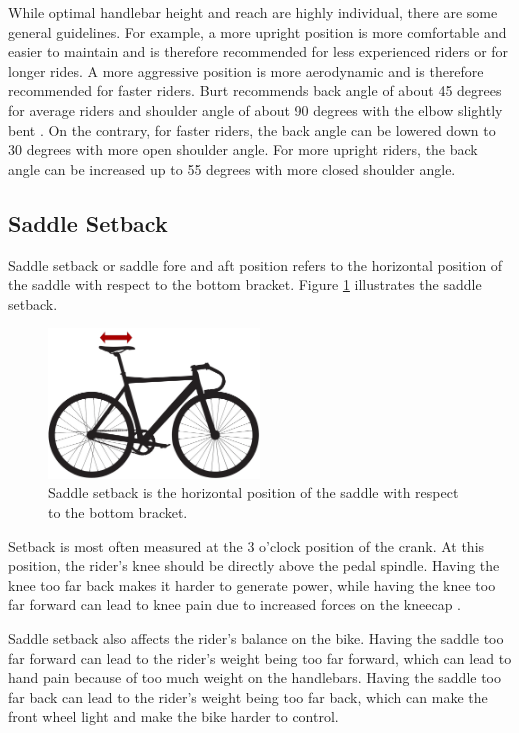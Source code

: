 While optimal handlebar height and reach are highly individual, there are some general guidelines. For example, a more upright position is more comfortable and easier to maintain and is therefore recommended for less experienced riders or for longer rides. A more aggressive position is more aerodynamic and is therefore recommended for faster riders. Burt recommends back angle of about 45 degrees for average riders and shoulder angle of about 90 degrees with the elbow slightly bent \cite{burtbikefit}. On the contrary, for faster riders, the back angle can be lowered down to 30 degrees with more open shoulder angle. For more upright riders, the back angle can be increased up to 55 degrees with more closed shoulder angle.

\subsection{Saddle Setback}
Saddle setback or saddle fore and aft position refers to the horizontal position of the saddle with respect to the bottom bracket. Figure \ref{fig:saddle_setback} illustrates the saddle setback.

\begin{figure}[htb]
    \centering
    \includegraphics[width=0.5\textwidth]{obrazky-figures/saddle_setback_small.png}
    \caption{Saddle setback is the horizontal position of the saddle with respect to the bottom bracket.}
    \label{fig:saddle_setback}
\end{figure}

Setback is most often measured at the 3 o'clock position of the crank. At this position, the rider's knee should be directly above the pedal spindle. Having the knee too far back makes it  harder to generate power, while having the knee too far forward can lead to knee pain due to increased forces on the kneecap \cite{burtbikefit}.

Saddle setback also affects the rider's balance on the bike. Having the saddle too far forward can lead to the rider's weight being too far forward, which can lead to hand pain because of too much weight on the handlebars. Having the saddle too far back can lead to the rider's weight being too far back, which can make the front wheel light and make the bike harder to control.

